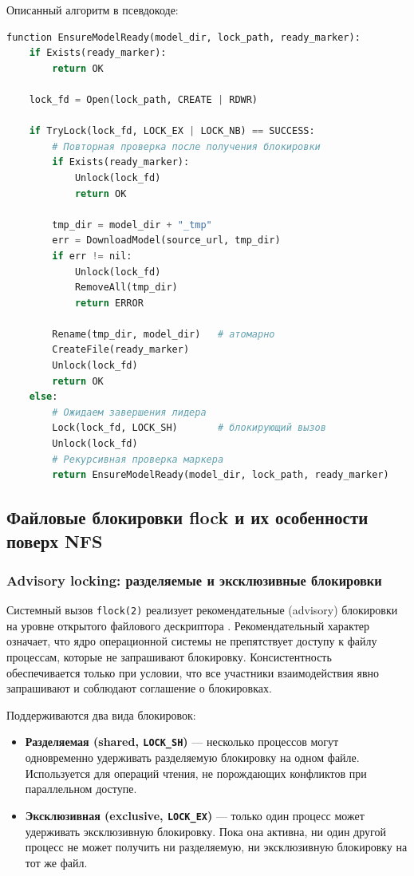 Описанный алгоритм в псевдокоде:

\begin{lstlisting}[language=Python, caption={Псевдокод координированной загрузки модели}]
function EnsureModelReady(model_dir, lock_path, ready_marker):
    if Exists(ready_marker):
        return OK

    lock_fd = Open(lock_path, CREATE | RDWR)

    if TryLock(lock_fd, LOCK_EX | LOCK_NB) == SUCCESS:
        # Повторная проверка после получения блокировки
        if Exists(ready_marker):
            Unlock(lock_fd)
            return OK

        tmp_dir = model_dir + "_tmp"
        err = DownloadModel(source_url, tmp_dir)
        if err != nil:
            Unlock(lock_fd)
            RemoveAll(tmp_dir)
            return ERROR

        Rename(tmp_dir, model_dir)   # атомарно
        CreateFile(ready_marker)
        Unlock(lock_fd)
        return OK
    else:
        # Ожидаем завершения лидера
        Lock(lock_fd, LOCK_SH)       # блокирующий вызов
        Unlock(lock_fd)
        # Рекурсивная проверка маркера
        return EnsureModelReady(model_dir, lock_path, ready_marker)
\end{lstlisting}

\subsection{Файловые блокировки flock и их особенности поверх NFS}

\subsubsection*{Advisory locking: разделяемые и эксклюзивные блокировки}

Системный вызов \texttt{flock(2)} реализует рекомендательные (advisory) блокировки на уровне открытого файлового дескриптора \cite{flock_man}. Рекомендательный характер означает, что ядро операционной системы не препятствует доступу к файлу процессам, которые не запрашивают блокировку. Консистентность обеспечивается только при условии, что все участники взаимодействия явно запрашивают и соблюдают соглашение о блокировках.

Поддерживаются два вида блокировок:
\begin{itemize}[leftmargin=*]
  \item \textbf{Разделяемая (shared, \texttt{LOCK\_SH})} --- несколько процессов могут одновременно удерживать разделяемую блокировку на одном файле. Используется для операций чтения, не порождающих конфликтов при параллельном доступе.
  \item \textbf{Эксклюзивная (exclusive, \texttt{LOCK\_EX})} --- только один процесс может удерживать эксклюзивную блокировку. Пока она активна, ни один другой процесс не может получить ни разделяемую, ни эксклюзивную блокировку на тот же файл.
\end{itemize}

